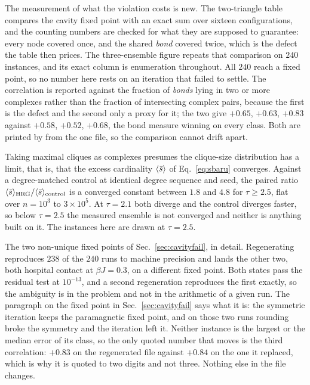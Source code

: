The measurement of what the violation costs is new. The two-triangle table
compares the cavity fixed point with an exact sum over sixteen configurations,
and the counting numbers are checked for what they are supposed to guarantee:
every node covered once, and the shared \emph{bond} covered twice, which is the
defect the table then prices. The three-ensemble figure repeats that comparison
on $240$ instances, and its exact column is enumeration throughout. All $240$
reach a fixed point, so no number here rests on an iteration that failed to
settle. The correlation is reported against the fraction of \emph{bonds} lying
in two or more complexes rather than the fraction of intersecting complex pairs,
because the first is the defect and the second only a proxy for it; the two give
$+0.65$, $+0.63$, $+0.83$ against $+0.58$, $+0.52$, $+0.68$, the bond measure
winning on every class. Both are printed by  from the one
file, so the comparison cannot drift apart.

Taking maximal cliques as complexes presumes the clique-size distribution has a
limit, that is, that the excess cardinality $\langle \bar s \rangle$ of
Eq.~\eqref{eq:sbaru} converges. Against a degree-matched control at identical
degree sequence and seed, the paired ratio
$\langle \bar s \rangle_{\mathrm{HRG}}/\langle \bar s \rangle_{\mathrm{control}}$ is a converged
constant between $1.8$ and $4.8$ for $\tau\ge2.5$, flat over $n=10^{3}$ to
$3\times10^{5}$. At $\tau=2.1$ both diverge and the control diverges faster, so
below $\tau=2.5$ the measured ensemble is not converged and neither is anything
built on it. The instances here are drawn at $\tau=2.5$.

The two non-unique fixed points of Sec.~\ref{sec:cavityfail}, in detail.
Regenerating  reproduces $238$ of the
$240$ runs to machine precision and lands the other two, both hospital contact
at $\beta J=0.3$, on a different fixed point. Both states pass the residual
test at $10^{-13}$, and a second regeneration reproduces the first exactly, so
the ambiguity is in the problem and not in the arithmetic of a given run. The
paragraph on the fixed point in Sec.~\ref{sec:cavityfail} says what it is:
the symmetric iteration keeps the paramagnetic fixed point, and on those two
runs rounding broke the symmetry and the iteration left it.
Neither instance is the largest or the median error of its class, so the only
quoted number that moves is the third correlation: $+0.83$ on the regenerated
file against $+0.84$ on the one it replaced, which is why it is quoted to two
digits and not three. Nothing else in the file changes.

